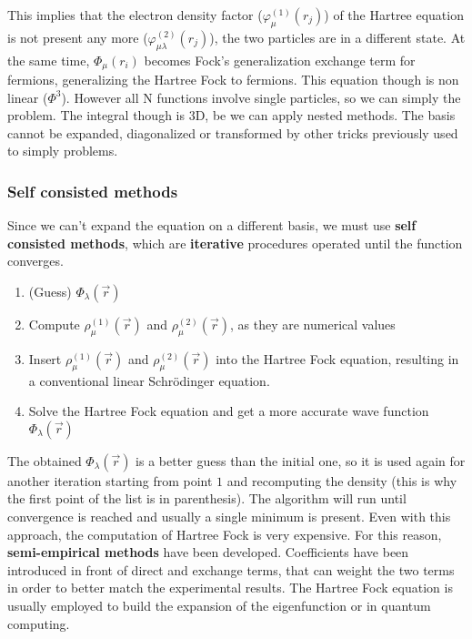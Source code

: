 		This implies that the electron density factor ($\varphi^{(1)}_\mu(r_j)$) of the Hartree equation is not present any more ($\varphi^{(2)}_{\mu\lambda}(r_j)$), the two particles are in a different state.
		At the same time, $\Phi_\mu(r_i)$ becomes Fock's generalization exchange term for fermions, generalizing the Hartree Fock to fermions.
		This equation though is non linear ($\Phi^3$).
		However all N functions involve single particles, so we can simply the problem.
		The integral though is 3D, be we can apply nested methods.
		The basis cannot be expanded, diagonalized or transformed by other tricks previously used to simply problems.

		\subsubsection{Self consisted methods}
		Since we can't expand the equation on a different basis, we must use \textbf{self consisted methods}, which are \textbf{iterative} procedures operated until the function converges.

		\begin{multicols}{2}
			\begin{enumerate}
				\item (Guess) $\Phi_\lambda (\vec{r})$
				\item Compute $\rho_\mu^{(1)}(\vec{r})$ and $\rho_\mu^{(2)}(\vec{r})$, as they are numerical values
				\item Insert $\rho_\mu^{(1)}(\vec{r})$ and $\rho_\mu^{(2)}(\vec{r})$ into the Hartree Fock equation, resulting in a conventional linear Schr\"odinger equation.
				\item Solve the Hartree Fock equation and get a more accurate wave function $\Phi_\lambda (\vec{r})$
			\end{enumerate}
		\end{multicols}

		The obtained $\Phi_\lambda (\vec{r})$ is a better guess than the initial one, so it is used again for another iteration starting from point $1$ and recomputing the density (this is why the first point of the list is in parenthesis).
		The algorithm will run until convergence is reached and usually a single minimum is present.
		Even with this approach, the computation of Hartree Fock is very expensive.
		For this reason, \textbf{semi-empirical methods} have been developed.
		Coefficients have been introduced in front of direct and exchange terms, that can weight the two terms in order to better match the experimental results.
		The Hartree Fock equation is usually employed to build the expansion of the eigenfunction or in quantum computing.

